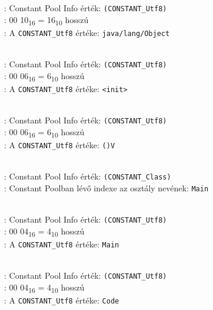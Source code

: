 \begin{compactitem}
\begin{compactitem}
	: Constant Pool Info érték: \lstinline{(CONSTANT_Utf8)} \\
    : 00 10\textsubscript{16} = 16\textsubscript{10} hosszú \\
    : A \lstinline{CONSTANT_Utf8} értéke: \lstinline{java/lang/Object}
	\item {}   \\
	: Constant Pool Info érték: \lstinline{(CONSTANT_Utf8)} \\
    : 00 06\textsubscript{16} = 6\textsubscript{10} hosszú \\
    : A \lstinline{CONSTANT_Utf8} értéke: \lstinline{<init>}
	\item {}   \\
	: Constant Pool Info érték: \lstinline{(CONSTANT_Utf8)} \\
    : 00 06\textsubscript{16} = 6\textsubscript{10} hosszú \\
    : A \lstinline{CONSTANT_Utf8} értéke: \lstinline{()V}
	\item {}  \\
	: Constant Pool Info érték: \lstinline{(CONSTANT_Class)} \\
    : Constant Poolban lévő indexe az osztály nevének: \lstinline{Main}
	\item {}   \\
	: Constant Pool Info érték: \lstinline{(CONSTANT_Utf8)} \\
    : 00 04\textsubscript{16} = 4\textsubscript{10} hosszú \\
    : A \lstinline{CONSTANT_Utf8} értéke: \lstinline{Main}
	\item {}   \\
	: Constant Pool Info érték: \lstinline{(CONSTANT_Utf8)} \\
    : 00 04\textsubscript{16} = 4\textsubscript{10} hosszú \\
    : A \lstinline{CONSTANT_Utf8} értéke: \lstinline{Code}

\end{compactitem}
\end{compactitem}
